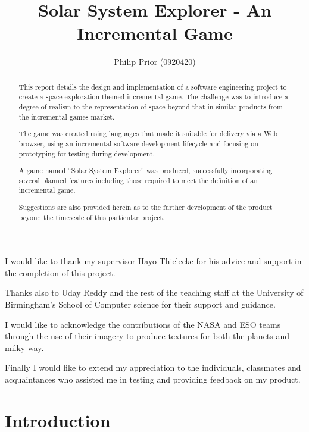 \documentclass[twoside]{bhamthesis}
\title{Solar System Explorer - An Incremental Game}
\author{Philip Prior (0920420)}
\begin{document}
\maketitle
\clearemptydoublepage

\tableofcontents

\listoffigures
{}

\begin{abstract}

This report details the design and implementation of a software engineering project to create a space exploration themed incremental game. The challenge was to introduce a degree of realism to the representation of space beyond that in similar products from the incremental games market.

The game was created using languages that made it suitable for delivery via a Web browser, using an incremental software development lifecycle and focusing on prototyping for testing during development.

A game named “Solar System Explorer” was produced, successfully incorporating several planned features including those required to meet the definition of an incremental game.

Suggestions are also provided herein as to the further development of the product beyond the timescale of this particular project.

\end{abstract}

\begin{acknowledgments}
I would like to thank my supervisor Hayo Thielecke for his advice and support in the completion of this project.

Thanks also to Uday Reddy and the rest of the teaching staff at the University of Birmingham's School of Computer science for their support and guidance.

I would like to acknowledge the contributions of the NASA and ESO teams through the use of their imagery to produce textures for both the planets and milky way.

Finally I would like to extend my appreciation to the individuals, classmates and acquaintances who assisted me in testing and providing feedback on my product.
\end{acknowledgments}

\section{Introduction}
\end{document}
